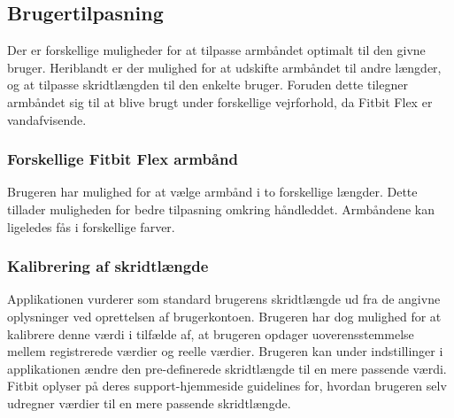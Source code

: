 \subsection{Brugertilpasning} \label{sec:brugertilpasning}
Der er forskellige muligheder for at tilpasse armbåndet optimalt til den givne bruger. Heriblandt er der mulighed for at udskifte armbåndet til andre længder, og at tilpasse skridtlængden til den enkelte bruger. Foruden dette tilegner armbåndet sig til at blive brugt under forskellige vejrforhold, da Fitbit Flex er vandafvisende. 

\subsubsection{Forskellige Fitbit Flex armbånd}
Brugeren har mulighed for at vælge armbånd i to forskellige længder. Dette tillader muligheden for bedre tilpasning omkring håndleddet. Armbåndene kan ligeledes fås i forskellige farver.

\subsubsection{Kalibrering af skridtlængde}
Applikationen vurderer som standard brugerens skridtlængde ud fra de angivne oplysninger ved oprettelsen af brugerkontoen. Brugeren har dog mulighed for at kalibrere denne værdi i tilfælde af, at brugeren opdager uoverensstemmelse mellem registrerede værdier og reelle værdier. Brugeren kan under indstillinger i applikationen ændre den pre-definerede skridtlængde til en mere passende værdi. Fitbit oplyser på deres support-hjemmeside guidelines for, hvordan brugeren selv udregner værdier til en mere passende skridtlængde.   

